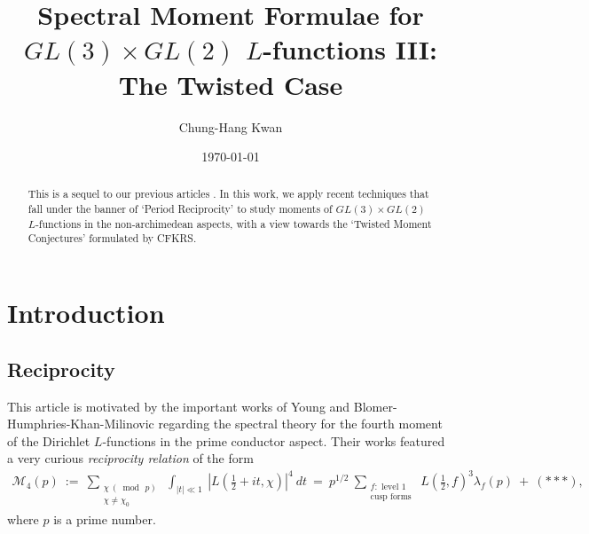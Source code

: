 \documentclass[11pt,reqno]{amsart}
\title[Spectral Moment Formulae for $GL(3)\times GL(2)$ $L$-functions III]{Spectral Moment Formulae for $GL(3)\times GL(2)$ $L$-functions III: The Twisted Case}
\author[C.-H. Kwan]{Chung-Hang Kwan}
\date{\today}
\theoremstyle{definition}
\theoremstyle{definition}
\theoremstyle{remark}
\numberwithin{equation}{section}
\begin{document}
\maketitle



\begin{abstract}
	This is a sequel to our previous articles \cite{Kw23, Kw23a+}. In this work, we  apply  recent techniques  that fall under the banner of  `Period Reciprocity' to study  moments of  $GL(3)\times GL(2)$ $L$-functions in the non-archimedean aspects,  with a view towards   the `Twisted Moment Conjectures' formulated by  CFKRS. 

\end{abstract}
	



\section{Introduction}\label{intr}


\subsection{Reciprocity}\label{reciprsec} This article is motivated by the important works of Young \cite{Y11}  and Blomer-Humphries-Khan-Milinovic  \cite{BHKM20} regarding the spectral theory for the fourth moment of the Dirichlet $L$-functions in the prime conductor aspect.  Their works featured a very curious  \textit{reciprocity relation}  of the form
\begin{align}\label{basicmototwis}
 \mathcal{M}_{4}(p) \ := \ \sum_{\substack{\chi \ (\bmod\, p) \\ \chi \neq \chi_{0}}}  \ \int_{|t| \ll 1} \ \left|L\left(\frac{1}{2}+it, \chi\right)\right|^4   \ dt
	\   = \  	p^{1/2} \ \sum_{\substack{f: \text{ level $1$ } \\ \text{cusp forms}}} \   L\left( \frac{1}{2}, f\right)^3 \lambda_{f}(p)    \ +   \  (***),
\end{align}
where $p$ is a prime number.  
\end{document}
